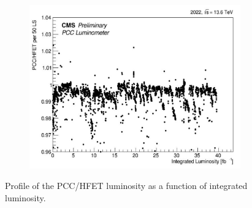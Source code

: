 \begin{itemize}
\begin{figure}[!htp]
  \centering
  \begin{subfigure}[b]{1\textwidth}
    \includegraphics[width=\textwidth]{ashish_thesis/PCC_HFOCvsls_ProfileX_all_2022_1.png}
  \end{subfigure}
  \hfill %
  \caption[Luminosity Ratio Profile]{Profile of the PCC/HFET luminosity as a function of integrated luminosity.} %
\label{fig:stabprof_78}
\end{figure}



\end{itemize}
